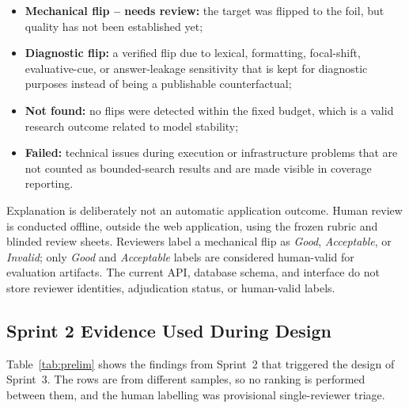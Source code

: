 \documentclass[11pt,a4paper]{article}
\begin{document}
\begin{itemize}
  \item \textbf{Mechanical flip -- needs review:} the target was flipped to the foil,
  but quality has not been established yet;
  \item \textbf{Diagnostic flip:} a verified flip due to lexical, formatting,
  focal-shift, evaluative-cue, or answer-leakage sensitivity that is kept for
  diagnostic purposes instead of being a publishable counterfactual;
  \item \textbf{Not found:} no flips were detected within the fixed budget, which is
  a valid research outcome related to model stability;
  \item \textbf{Failed:} technical issues during execution or infrastructure problems
  that are not counted as bounded-search results and are made visible in coverage
  reporting.
\end{itemize}

Explanation is deliberately not an automatic application outcome. Human review is
conducted offline, outside the web application, using the frozen rubric and blinded
review sheets. Reviewers label a mechanical flip as \emph{Good}, \emph{Acceptable},
or \emph{Invalid}; only \emph{Good} and \emph{Acceptable} labels are considered
human-valid for evaluation artifacts. The current API, database schema, and interface
do not store reviewer identities, adjudication status, or human-valid labels.

\subsection{Sprint 2 Evidence Used During Design}

Table~\ref{tab:prelim} shows the findings from Sprint~2 that triggered the design of
Sprint~3. The rows are from different samples, so no ranking is performed between
them, and the human labelling was provisional single-reviewer triage.
\end{document}
